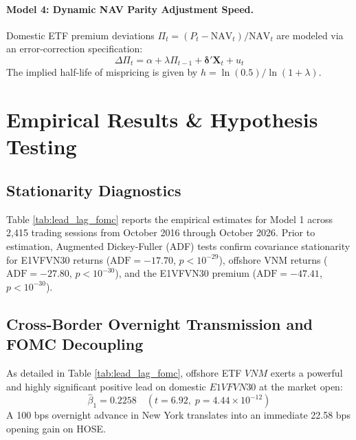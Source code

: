 \documentclass{article}
\begin{document}
\paragraph{Model 4: Dynamic NAV Parity Adjustment Speed.}
Domestic ETF premium deviations $\Pi_t = (P_t - \text{NAV}_t)/\text{NAV}_t$ are modeled via an error-correction specification:
\begin{equation}
    \Delta \Pi_t = \alpha + \lambda \Pi_{t-1} + \boldsymbol{\delta}' \mathbf{X}_t + u_t
\end{equation}
The implied half-life of mispricing is given by $h = \ln(0.5) / \ln(1 + \lambda)$.

\section{Empirical Results \& Hypothesis Testing}
\label{sec:results}

\subsection{Stationarity Diagnostics}

Table \ref{tab:lead_lag_fomc} reports the empirical estimates for Model 1 across 2,415 trading sessions from October 2016 through October 2026. Prior to estimation, Augmented Dickey-Fuller (ADF) tests \citep{dickey1979distribution} confirm covariance stationarity for E1VFVN30 returns ($\text{ADF} = -17.70$, $p < 10^{-29}$), offshore VNM returns ($\text{ADF} = -27.80$, $p < 10^{-30}$), and the E1VFVN30 premium ($\text{ADF} = -47.41$, $p < 10^{-30}$).



\subsection{Cross-Border Overnight Transmission and FOMC Decoupling}

As detailed in Table \ref{tab:lead_lag_fomc}, offshore ETF $VNM$ exerts a powerful and highly significant positive lead on domestic $E1VFVN30$ at the market open:
$$\hat{\beta}_1 = 0.2258 \quad (t = 6.92, \; p = 4.44 \times 10^{-12})$$
A 100 bps overnight advance in New York translates into an immediate 22.58 bps opening gain on HOSE. 
\end{document}
